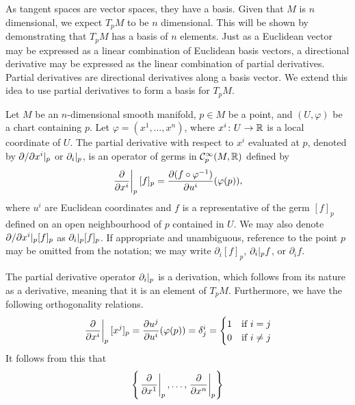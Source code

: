 \documentclass[a4paper,12pt]{article}
\begin{document}
As tangent spaces are vector spaces, they have a basis.
Given that $M$ is $n$ dimensional, we expect $T_p M$ to be $n$ dimensional.
This will be shown by demonstrating that $T_p M$ has a basis of $n$ elements.
Just as a Euclidean vector may be expressed as a linear combination of Euclidean basis vectors, a directional derivative may be expressed as the linear combination of partial derivatives.
Partial derivatives are directional derivatives along a basis vector.
We extend this idea to use partial derivatives to form a basis for $T_p M$.
\begin{definition}\label{def:partial_derivative_of_germ}
    Let $M$ be an $n$-dimensional smooth manifold, $p \in M$ be a point, and $(U, \varphi)$ be a chart containing $p$.
    Let $\varphi = (x^1, \ldots, x^n)$, where $x^i \colon U \to \mathbb{R}$ is a local coordinate of $U$.
    The partial derivative with respect to $x^i$ evaluated at $p$, denoted by $\eval*{\partial/\partial x^i}{p}$ or $\eval*{\partial_i}{p}$, is an operator of germs in $\mathcal{C}^\infty_p(M, \mathbb{R})$ defined by
    \begin{equation}
        \eval{\frac{\partial}{\partial x^i}}{p} [f]_p = \frac{\partial(f \circ \varphi^{-1})}{\partial u^i}(\varphi(p)),
    \end{equation}
    where $u^i$ are Euclidean coordinates and $f$ is a representative of the germ $[f]_p$ defined on an open neighbourhood of $p$ contained in $U$.
    We may also denote $\eval*{\partial/\partial x^i}{p} [f]_p$ as $\eval*{\partial_i}{p} [f]_p$.
    If appropriate and unambiguous, reference to the point $p$ may be omitted from the notation; we may write $\partial_i [f]_p$, $\eval*{\partial_i}{p}f$, or $\partial_i f$.
\end{definition}
The partial derivative operator $\eval*{\partial_i}{p}$ is a derivation, which follows from its nature as a derivative, meaning that it is an element of $T_p M$.
Furthermore, we have the following orthogonality relations.
\begin{equation}\label{eq:tangent_space_orthogonality_relations}
    \eval{\frac{\partial}{\partial x^i}}{p} [x^j]_p = \frac{\partial u^j}{\partial u^i}(\varphi(p)) = \delta^i_j = \begin{cases}
        1 & \text{if } i = j \\
        0 & \text{if } i \neq j
    \end{cases}
\end{equation}
It follows from this that
\begin{equation*}
    \left\{\eval{\frac{\partial}{\partial x^1}}{p}, \ldots, \eval{\frac{\partial}{\partial x^n}}{p}\right\}
\end{equation*}
\end{document}
